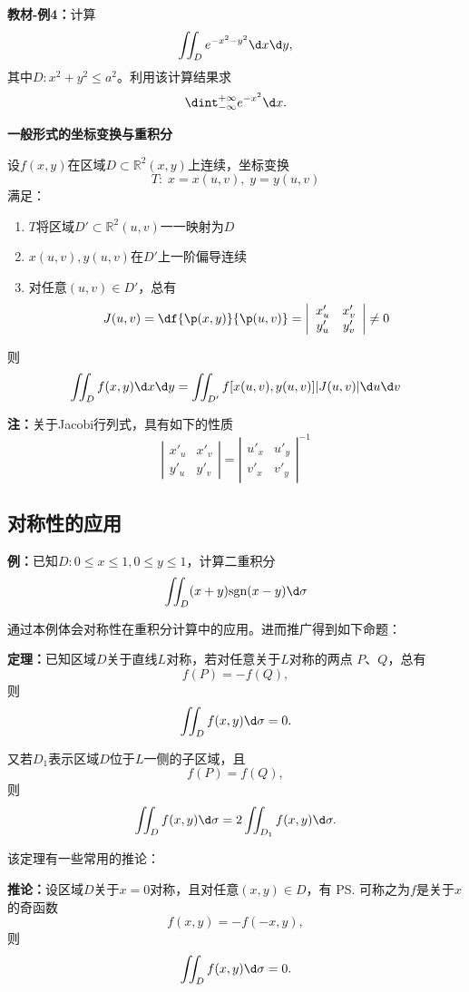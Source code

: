 {\bf 教材-例4：}计算
$$\iint_De^{-x^2-y^2}\d x\d y,$$
其中$D:x^2+y^2\leq a^2$。利用该计算结果求
$$\dint_{-\infty}^{+\infty}e^{-x^2}\d x.$$

\begin{shaded}
	{\bf 一般形式的坐标变换与重积分}
	
	设$f(x,y)$在区域$D\subset\mathbb{R}^2(x,y)$上连续，坐标变换
	$$T:\;x=x(u,v),\;y=y(u,v)$$
	满足：
	\begin{enumerate}[(1)]
	  \item $T$将区域$D'\subset\mathbb{R}^2(u,v)$一一映射为$D$
	  \item $x(u,v),y(u,v)$在$D'$上一阶偏导连续
	  \item 对任意$(u,v)\in D'$，总有
	  $$J(u,v)=\df{\p(x,y)}{\p(u,v)}=\left|\begin{array}{cc}
	  	x'_u & x'_v \\ y'_u & y'_v
	  \end{array}\right|\ne 0$$
	\end{enumerate}
	则
	$$\iint_Df(x,y)\d x\d y=\iint_{D'}f[x(u,v),y(u,v)]|J(u,v)|\d u\d v$$
	
	{\bf 注：}关于Jacobi行列式，具有如下的性质
	$$\left|\begin{array}{cc}
	  	x'_u & x'_v \\ y'_u & y'_v
	  \end{array}\right|
	  =\left|\begin{array}{cc}
	  	u'_x & u'_y \\ v'_x & v'_y
	  \end{array}\right|^{-1}$$
\end{shaded}

\subsection{对称性的应用}

{\bf 例：}已知$D:0\leq x\leq1,0\leq y\leq1$，计算二重积分
$$\iint_D(x+y)\mathrm{sgn}(x-y)\d\sigma$$

通过本例体会对称性在重积分计算中的应用。进而推广得到如下命题：

{\bf 定理：}已知区域$D$关于直线$L$对称，若对任意关于$L$对称的两点
$P$、$Q$，总有
$$f(P)=-f(Q),$$
则
$$\iint_Df(x,y)\d\sigma=0.$$

又若$D_1$表示区域$D$位于$L$一侧的子区域，且
$$f(P)=f(Q),$$
则
$$\iint_Df(x,y)\d\sigma=2\iint_{D_1}f(x,y)\d\sigma.$$

该定理有一些常用的推论：

{\bf 推论：}设区域$D$关于$x=0$对称，且对任意$(x,y)\in D$，有
\ps{可称之为$f$是关于$x$的奇函数}
$$f(x,y)=-f(-x,y),$$
则
$$\iint_Df(x,y)\d\sigma=0.$$


